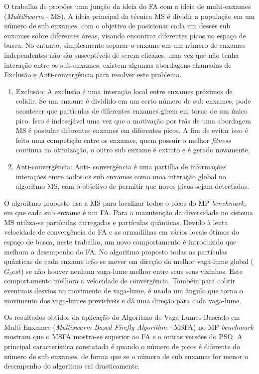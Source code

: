 O trabalho de \cite{farahani2011multiswarm} propões uma junção da ideia do FA com a ideia de multi-enxames (\textit{MultiSwarm} - MS). A ideia principal da técnica MS é dividir a população em um número de sub enxames, com o objetivo de posicionar cada um desses sub enxames sobre diferentes áreas, visando encontrar diferentes picos no espaço de busca. No entanto, simplesmente separar o enxame em um número de enxames independentes não são susceptíveis de serem eficazes, uma vez que não tenha interação entre os sub enxames. existem algumas abordagens chamadas de Exclusão e Anti-convergência para resolver este problema.

\begin{enumerate}
\item Exclusão: A exclusão é uma interação local entre enxames próximos de colidir. Se um enxame é dividido em um certo número de sub enxames, pode acontecer que partículas de diferentes enxames girem em torno de um único pico. Isso é indesejável uma vez que a motivação por trás de uma abordagem MS é postular diferentes enxames em diferentes picos. A fim de evitar isso é feito uma competição entre os enxames, quem possuir o melhor \textit{fitness} continua na otimização, o outro sub enxame é extinto e é gerado novamente.

\item Anti-convergência: Anti- convergência é uma partilha de informações interações entre todos os sub enxames como uma interação global no algoritmo MS, com o objetivo de permitir que novos picos sejam detectados.
\end{enumerate}

O algoritmo proposto usa a MS para localizar todos o picos do MP \textit{benchmark}, em que cada sub enxame é um FA. Para a manutenção da diversidade no sistema MS utiliza-se partículas carregadas e partículas quânticas. Devido à lenta velocidade de convergência do FA e as armadilhas em vários locais ótimos do espaço de busca, neste trabalho, um novo comportamento é introduzido que melhora o desempenho do FA. No algoritmo proposto todas as partículas quânticas de cada enxame irão se mover em direção do melhor vaga-lume global ($G_best$) se não houver nenhum vaga-lume melhor entre seus seus vizinhos. Este comportamento melhora a velocidade de convergência. Também para cobrir eventuais desvios no movimento de vaga-lume, é usado um ângulo que torna o movimento dos vaga-lumes previsíveis e dá uma direção para cada vaga-lume.

Os resultados obtidos da aplicação do Algoritmo de Vaga-Lumes Baseado em Multi-Enxames (\textit{Multiswarm Based Firefly Algorithm} - MSFA) no MP \textit{benchmark} mostram que o MSFA mostra-se superior ao FA e a outras versões do PSO. A principal característica constatada é quando o número de picos é diferente do número de sub enxames, de forma que se o número de sub enxames for menor o desempenho do algoritmo cai drasticamente.

